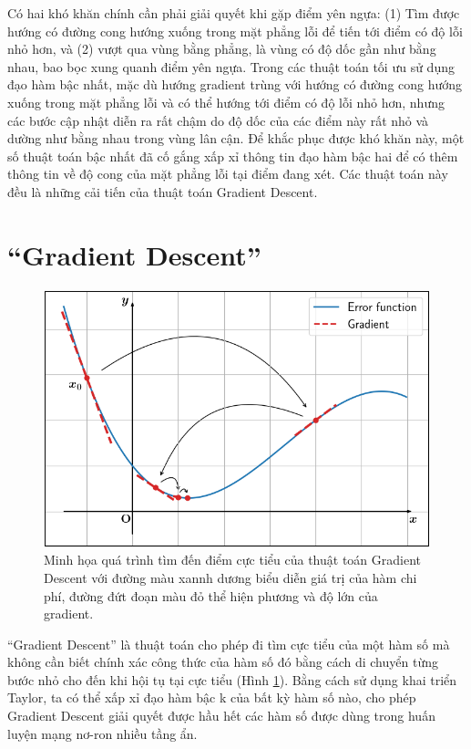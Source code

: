 Có hai khó khăn chính cần phải giải quyết khi gặp điểm yên ngựa: (1) Tìm được hướng có đường cong hướng xuống trong mặt phẳng lỗi để tiến tới điểm có độ lỗi nhỏ hơn, và (2) vượt qua vùng bằng phẳng, là vùng có độ dốc gần như bằng nhau, bao bọc xung quanh điểm yên ngựa. Trong các thuật toán tối ưu sử dụng đạo hàm bậc nhất, mặc dù hướng gradient trùng với hướng có đường cong hướng xuống trong mặt phẳng lỗi và có thể hướng tới điểm có độ lỗi nhỏ hơn, nhưng các bước cập nhật diễn ra rất chậm do độ dốc của các điểm này rất nhỏ và dường như bằng nhau trong vùng lân cận. Để khắc phục được khó khăn này, một số thuật toán bậc nhất đã cố gắng xấp xỉ thông tin đạo hàm bậc hai để có thêm thông tin về độ cong của mặt phẳng lỗi tại điểm đang xét. Các thuật toán này đều là những cải tiến của thuật toán Gradient Descent.

\section{``Gradient Descent''}

\begin{figure}[H]
\centering
\includegraphics[width=75 mm]{images/gd.png}
\caption{Minh họa quá trình tìm đến điểm cực tiểu của thuật toán Gradient Descent với đường màu xannh dương biểu diễn giá trị của hàm chi phí, đường đứt đoạn màu đỏ thể hiện phương và độ lớn của gradient.}
\label{fig:gd}
\end{figure}

``Gradient Descent'' là thuật toán cho phép đi tìm cực tiểu của một hàm số mà không cần biết chính xác công thức của hàm số đó bằng cách di chuyển từng bước nhỏ cho đến khi hội tụ tại cực tiểu (Hình \ref{fig:gd}). Bằng cách sử dụng khai triển Taylor, ta có thể xấp xỉ đạo hàm bậc k của bất kỳ hàm số nào, cho phép Gradient Descent giải quyết được hầu hết các hàm số được dùng trong huấn luyện mạng nơ-ron nhiều tầng ẩn.

